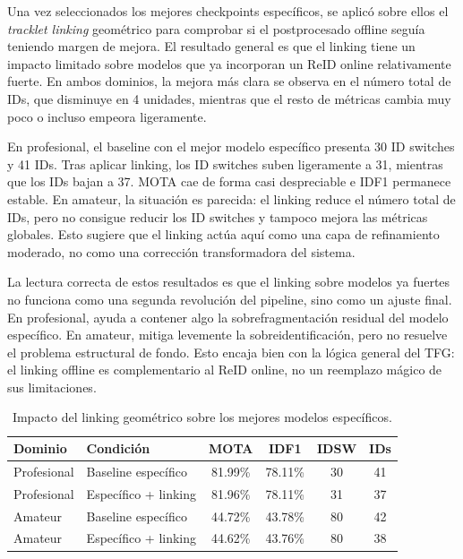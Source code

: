 \documentclass[../MAIN.tex]{subfiles}
\begin{document}
	Una vez seleccionados los mejores checkpoints específicos, se aplicó sobre ellos el \textit{tracklet linking} geométrico para comprobar si el postprocesado offline seguía teniendo margen de mejora. El resultado general es que el linking tiene un impacto limitado sobre modelos que ya incorporan un ReID online relativamente fuerte. En ambos dominios, la mejora más clara se observa en el número total de IDs, que disminuye en 4 unidades, mientras que el resto de métricas cambia muy poco o incluso empeora ligeramente.
	
	En profesional, el baseline con el mejor modelo específico presenta 30 ID switches y 41 IDs. Tras aplicar linking, los ID switches suben ligeramente a 31, mientras que los IDs bajan a 37. MOTA cae de forma casi despreciable e IDF1 permanece estable. En amateur, la situación es parecida: el linking reduce el número total de IDs, pero no consigue reducir los ID switches y tampoco mejora las métricas globales. Esto sugiere que el linking actúa aquí como una capa de refinamiento moderado, no como una corrección transformadora del sistema.
	
	La lectura correcta de estos resultados es que el linking sobre modelos ya fuertes no funciona como una segunda revolución del pipeline, sino como un ajuste final. En profesional, ayuda a contener algo la sobrefragmentación residual del modelo específico. En amateur, mitiga levemente la sobreidentificación, pero no resuelve el problema estructural de fondo. Esto encaja bien con la lógica general del TFG: el linking offline es complementario al ReID online, no un reemplazo mágico de sus limitaciones.
	
	\begin{table}[H]
		\centering
		\caption{Impacto del linking geométrico sobre los mejores modelos específicos.}
		\label{tab:cap11_linking_best_models}
		\begin{tabular}{llcccc}
			\toprule
			\textbf{Dominio} & \textbf{Condición} & \textbf{MOTA} & \textbf{IDF1} & \textbf{IDSW} & \textbf{IDs} \\
			\midrule
			Profesional & Baseline específico & 81.99\% & 78.11\% & 30 & 41 \\
			Profesional & Específico + linking & 81.96\% & 78.11\% & 31 & 37 \\
			Amateur & Baseline específico & 44.72\% & 43.78\% & 80 & 42 \\
			Amateur & Específico + linking & 44.62\% & 43.76\% & 80 & 38 \\
			\bottomrule
		\end{tabular}
	\end{table}
	
	\newpage
	
\end{document}
